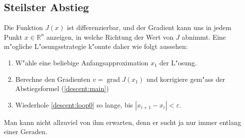 \subsection{Steilster Abstieg}
Die Funktion $J(x)$ ist differenzierbar, und der Gradient kann uns in
jedem Punkt $x\in\mathbb R^n$ anzeigen, in welche Richtung der Wert
von $J$ abnimmt. Eine m"ogliche L"osungsstrategie k"onnte daher
wie folgt aussehen:
\begin{enumerate}
\item W"ahle eine beliebige Anfangsapproximation $x_1$ der L"osung.
\item \label{descent:loop0}
Berechne den Gradienten $v=\operatorname{grad}J(x_1)$ und
korrigiere gem"ass der Abstiegsformel (\ref{descent:main})
\item Wiederhole \ref{descent:loop0} so lange,
bis $|x_{i+1}-x_i|<\varepsilon$.
\end{enumerate}
Man kann nicht allzuviel von ihm erwarten, denn er sucht ja nur immer
entlang einer Geraden.

